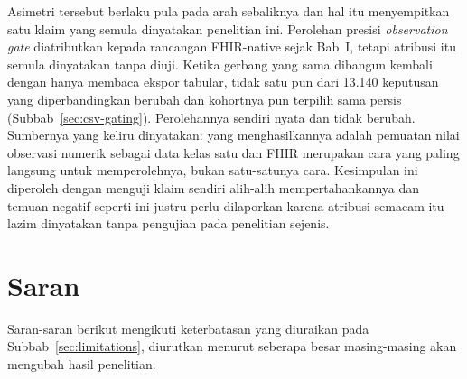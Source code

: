 Asimetri tersebut berlaku pula pada arah sebaliknya dan hal itu menyempitkan satu klaim yang
semula dinyatakan penelitian ini. Perolehan presisi \emph{observation gate} diatributkan kepada
rancangan FHIR-native sejak Bab~I, tetapi atribusi itu semula dinyatakan tanpa diuji. Ketika
gerbang yang sama dibangun kembali dengan hanya membaca ekspor tabular, tidak satu pun dari
13.140 keputusan yang diperbandingkan berubah dan kohortnya pun terpilih sama persis
(Subbab~\ref{sec:csv-gating}). Perolehannya sendiri nyata dan tidak berubah. Sumbernya yang
keliru dinyatakan: yang menghasilkannya adalah pemuatan nilai observasi numerik sebagai data
kelas satu dan FHIR merupakan cara yang paling langsung untuk memperolehnya, bukan satu-satunya
cara. Kesimpulan ini diperoleh dengan menguji klaim sendiri alih-alih mempertahankannya dan
temuan negatif seperti ini justru perlu dilaporkan karena atribusi semacam itu lazim dinyatakan
tanpa pengujian pada penelitian sejenis.

\section{Saran}

Saran-saran berikut mengikuti keterbatasan yang diuraikan pada Subbab~\ref{sec:limitations},
diurutkan menurut seberapa besar masing-masing akan mengubah hasil penelitian.

